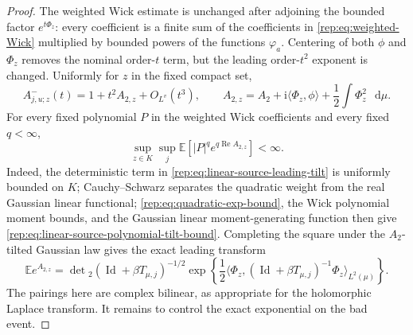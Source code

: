 \documentclass[11pt,reqno]{amsart}
\numberwithin{equation}{section}
\theoremstyle{plain}
\theoremstyle{definition}
\newcommand{\dd}{\mathop{}\!\mathrm d}
\newcommand{\E}{\mathbb E}
\newcommand{\Id}{\operatorname{Id}}
\newcommand{\be}{\beta}
\begin{document}
\begin{proof}
The weighted Wick estimate is unchanged after adjoining the bounded factor $e^{t\Phi_z}$: every coefficient is a finite sum of the coefficients in \eqref{rep:eq:weighted-Wick} multiplied by bounded powers of the functions $\varphi_a$.  Centering of both $\phi$ and $\Phi_z$ removes the nominal order-$t$ term, but
the leading order-$t^2$ exponent is changed.  Uniformly for $z$ in the fixed
compact set,
\begin{equation}\label{rep:eq:linear-source-leading-tilt}
 A^-_{j,u;z}(t)
 =1+t^2 A_{2,z}+O_{L^v}(t^3),
 \qquad
 A_{2,z}=A_2+\mathrm{i}\langle\Phi_z,\phi\rangle
 +\frac12\int\Phi_z^2\,\dd\mu.
\end{equation}
For every fixed polynomial $P$ in the weighted Wick coefficients and every
fixed $q<\infty$,
\begin{equation}\label{rep:eq:linear-source-polynomial-tilt-bound}
 \sup_{z\in K}\sup_j
 \E\left[|P|^q e^{q\operatorname{Re}A_{2,z}}\right]<\infty.
\end{equation}
Indeed, the deterministic term in \eqref{rep:eq:linear-source-leading-tilt} is
uniformly bounded on $K$; Cauchy--Schwarz separates the quadratic weight from
the real Gaussian linear functional; \eqref{rep:eq:quadratic-exp-bound}, the Wick
polynomial moment bounds, and the Gaussian linear moment-generating function
then give \eqref{rep:eq:linear-source-polynomial-tilt-bound}.  Completing the
square under the $A_2$-tilted Gaussian law gives the exact leading transform
\begin{equation}\label{rep:eq:linear-source-leading-transform}
 \E e^{A_{2,z}}
 =\det{}_2(\Id+\be T_{\mu,j})^{-1/2}
 \exp\left\{\frac12\langle\Phi_z,
 (\Id+\be T_{\mu,j})^{-1}\Phi_z\rangle_{L^2(\mu)}\right\}.
\end{equation}
The pairings here are complex bilinear, as appropriate for the holomorphic
Laplace transform.  It remains to control the exact exponential on the bad event.


\end{proof}
\end{document}

